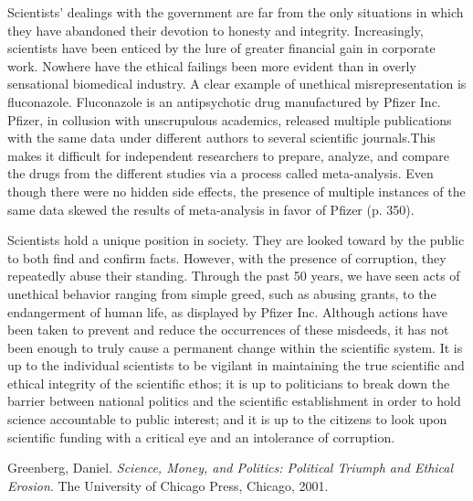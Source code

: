 \documentclass{article}[12pt]
\begin{document}
Scientists' dealings with the government are far from the only situations in
which they have abandoned their devotion to honesty and integrity.
Increasingly, scientists have been enticed by the lure of greater financial
gain in corporate work. Nowhere have the ethical failings been more evident
than in overly sensational biomedical industry. A clear example of unethical
misrepresentation is fluconazole.  Fluconazole is an antipsychotic drug
manufactured by Pfizer Inc.  Pfizer, in collusion with unscrupulous academics,
released multiple publications with the same data under different authors to
several scientific journals.This makes it difficult for independent researchers
to prepare, analyze, and compare the drugs from  the different studies via a
process called meta-analysis. Even though there were no hidden side effects,
the presence of multiple instances of the same data skewed the results of
meta-analysis in favor of Pfizer (p. 350).

Scientists hold a unique position in society. They are looked toward by the
public to both find and confirm facts. However, with the presence of
corruption, they repeatedly abuse their standing.  Through the past 50 years,
we have seen acts of unethical behavior ranging from simple greed, such as
abusing grants, to the endangerment of human life, as displayed by Pfizer Inc.
Although actions have been taken to prevent and reduce the occurrences of these
misdeeds, it has not been enough to truly cause a permanent change within the
scientific system. It is up to the individual scientists to be vigilant in
maintaining the true scientific and ethical integrity of the scientific ethos;
it is up to politicians to break down the barrier between national politics and
the scientific establishment in order to hold science accountable to public
interest; and it is up to the citizens to look upon scientific funding with a
critical eye and an intolerance of corruption.

\newpage
\begin{thebibliography}{9}

  Greenberg, Daniel.
  \emph{Science, Money, and Politics: Political Triumph and Ethical Erosion}.
  The University of Chicago Press, Chicago,
  2001.

\end{thebibliography}
\end{document}
